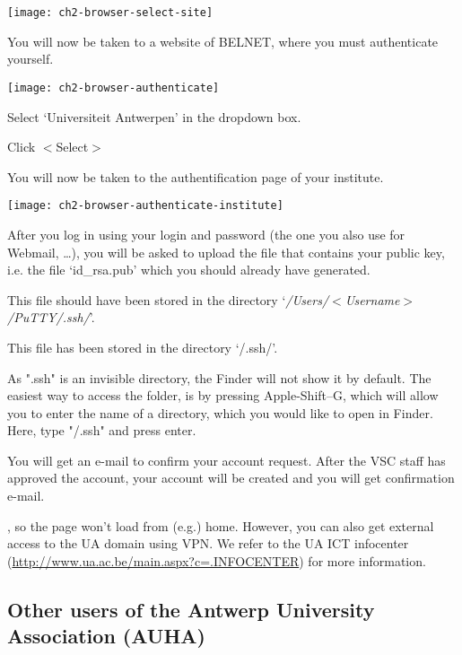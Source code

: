 \texttt{[image: ch2-browser-select-site]}

\ifantwerpen
  You will now be taken to a website of BELNET, where you must authenticate yourself.

  \texttt{[image: ch2-browser-authenticate]}

  Select `Universiteit Antwerpen' in the dropdown box.

  Click $<$Select$>$
\fi

You will now be taken to the authentification page of your institute.

\ifantwerpen
\texttt{[image: ch2-browser-authenticate-institute]}
\fi

After you log in using your \university login and password (the one you also
use for Webmail, \ldots ), you will be asked to upload the file that contains
your public key, i.e. the file `id\_rsa.pub' which you should already have
generated.

\ifwindows

  This file should have been stored in the directory
  `\emph{/Users/$<$Username$>$/PuTTY/.ssh/}'.

\fi



\ifmac

  This file has been stored in the directory `\tilde/.ssh/'.

   As ".ssh" is an invisible directory, the Finder will
  not show it by default. The easiest way to access the folder, is by pressing
  Apple-Shift--G, which will allow you to enter the name of a directory, which
  you would like to open in Finder. Here, type "\tilde/.ssh" and press enter.

\fi

You will get an e-mail to confirm your account request. After the VSC staff has
approved the account, your account will be created and you will get
confirmation e-mail.

\ifantwerpen
{}, so the page won't load from (e.g.) home. However, you can also get
external access to the UA domain using VPN. We refer to the UA ICT infocenter
(\url{http://www.ua.ac.be/main.aspx?c=.INFOCENTER}) for more information.

\subsection{Other users of the Antwerp University Association (AUHA)}
\label{sec:other-users-of-antwerp-university}

